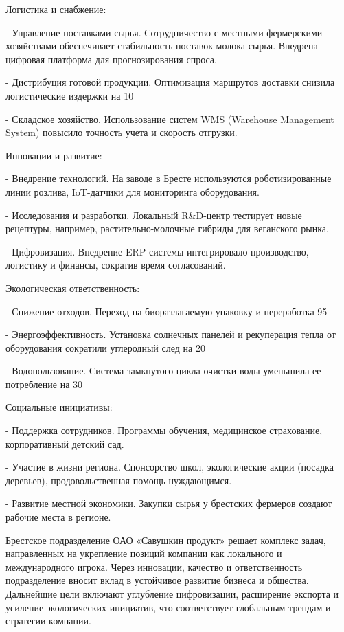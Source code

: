 {  \par \redline Логистика и снабжение:
  \par \redline - Управление поставками сырья. Сотрудничество с местными фермерскими хозяйствами обеспечивает стабильность поставок молока-сырья. Внедрена цифровая платформа для прогнозирования спроса.
  \par \redline - Дистрибуция готовой продукции. Оптимизация маршрутов доставки снизила логистические издержки на 10%
  \par \redline - Складское хозяйство. Использование систем WMS (Warehouse Management System) повысило точность учета и скорость отгрузки.

  \par \redline Инновации и развитие:
  \par \redline - Внедрение технологий. На заводе в Бресте используются роботизированные линии розлива, IoT-датчики для мониторинга оборудования.
  \par \redline - Исследования и разработки. Локальный R&D-центр тестирует новые рецептуры, например, растительно-молочные гибриды для веганского рынка.
  \par \redline - Цифровизация. Внедрение ERP-системы интегрировало производство, логистику и финансы, сократив время согласований.

  \par \redline Экологическая ответственность:
  \par \redline - Снижение отходов. Переход на биоразлагаемую упаковку и переработка 95%
  \par \redline - Энергоэффективность. Установка солнечных панелей и рекуперация тепла от оборудования сократили углеродный след на 20%
  \par \redline - Водопользование. Система замкнутого цикла очистки воды уменьшила ее потребление на 30%

  \par \redline Социальные инициативы:
  \par \redline - Поддержка сотрудников. Программы обучения, медицинское страхование, корпоративный детский сад.
  \par \redline - Участие в жизни региона. Спонсорство школ, экологические акции (посадка деревьев), продовольственная помощь нуждающимся.
  \par \redline - Развитие местной экономики. Закупки сырья у брестских фермеров создают рабочие места в регионе.

  \par \redline Брестское подразделение ОАО «Савушкин продукт» решает комплекс задач, направленных на укрепление позиций компании как локального и международного игрока. Через инновации, качество и ответственность подразделение вносит вклад в устойчивое развитие бизнеса и общества. Дальнейшие цели включают углубление цифровизации, расширение экспорта и усиление экологических инициатив, что соответствует глобальным трендам и стратегии компании.

  \par
}

